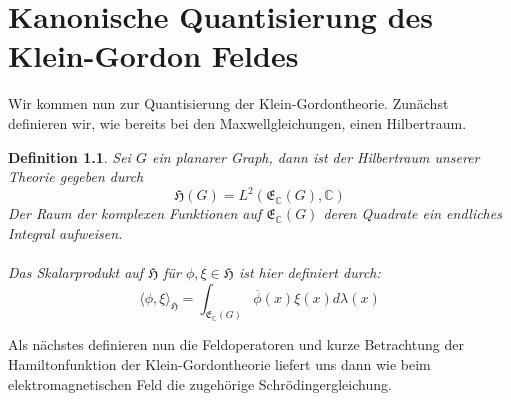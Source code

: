 \documentclass[11pt,a4paper,leqno]{report}
\newtheorem{definition}[theorem]{Definition}
\numberwithin{equation}{chapter}
\begin{document}
\chapter{Kanonische Quantisierung des Klein-Gordon Feldes}
Wir kommen nun zur Quantisierung der Klein-Gordontheorie.
Zun\"achst definieren wir, wie bereits bei den Maxwellgleichungen, einen Hilbertraum.
\begin{definition}
	Sei $G$ ein planarer Graph, dann ist der Hilbertraum unserer Theorie gegeben durch
	\begin{equation}
		\mathfrak{H}(G) = L^2(\mathfrak{E}_\mathbb{C}(G),\mathbb{C})
	\end{equation}
	Der Raum der komplexen Funktionen auf $\mathfrak{E}_\mathbb{C}(G)$ deren Quadrate ein endliches Integral aufweisen.\\
	\\
	Das Skalarprodukt auf $\mathfrak{H}$ f\"ur $\phi,\xi\in \mathfrak{H}$ ist hier definiert durch:
	\begin{equation}
		\langle \phi, \xi\rangle_{\mathfrak{H}} = \int_{\mathfrak{E}_\mathbb{C}(G)} \overline{\phi}(x)\xi(x)d\lambda(x)
	\end{equation}
\end{definition}
\noindent
Als n\"achstes definieren nun die Feldoperatoren und kurze Betrachtung der Hamiltonfunktion der Klein-Gordontheorie liefert uns dann wie beim elektromagnetischen Feld die zugeh\"orige Schr\"odingergleichung.
\end{document}

